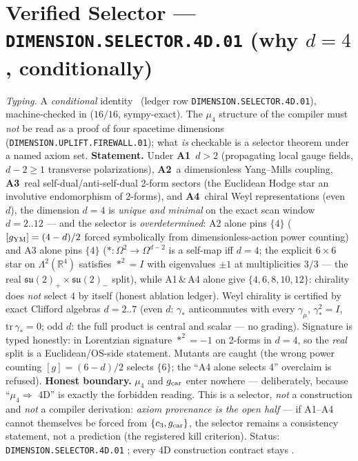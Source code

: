 \section*{Verified Selector --- \texttt{DIMENSION.SELECTOR.4D.01} (why $d=4$, conditionally)}
\noindent\emph{Typing.} A \emph{conditional} identity \mC\ (ledger row
\texttt{DIMENSION.SELECTOR.4D.01}), machine-checked in
 ($16/16$, sympy-exact).  The $\mu_4$ structure of the
compiler must \emph{not} be read as a proof of four spacetime dimensions
(\texttt{DIMENSION.UPLIFT.FIREWALL.01}); what \emph{is} checkable is a selector theorem under a
named axiom set.  \textbf{Statement.}  Under
\textbf{A1}~$d>2$ (propagating local gauge fields, $d-2\ge1$ transverse polarizations),
\textbf{A2}~a dimensionless Yang--Mills coupling,
\textbf{A3}~real self-dual/anti-self-dual 2-form sectors (the Euclidean Hodge star an involutive
endomorphism of 2-forms), and
\textbf{A4}~chiral Weyl representations (even $d$),
the dimension $d=4$ is \emph{unique and minimal} on the exact scan window $d=2..12$ --- and the
selector is \emph{overdetermined}: A2 alone pins $\{4\}$ ($[g_{\rm YM}]=(4-d)/2$ forced
symbolically from dimensionless-action power counting) and A3 alone pins $\{4\}$
($*:\Omega^2\to\Omega^{d-2}$ is a self-map iff $d=4$; the explicit $6\times6$ star on
$\Lambda^2(\mathbb R^4)$ satisfies $*^2=I$ with eigenvalues $\pm1$ at multiplicities $3/3$ ---
the real $\mathfrak{su}(2)_+\times\mathfrak{su}(2)_-$ split), while A1\,\&\,A4 alone give
$\{4,6,8,10,12\}$: chirality does \emph{not} select $4$ by itself (honest ablation ledger).
Weyl chirality is certified by exact Clifford algebras $d=2..7$ (even $d$: $\gamma_*$
anticommutes with every $\gamma_\mu$, $\gamma_*^2=I$, $\mathrm{tr}\,\gamma_*=0$; odd $d$: the
full product is central and scalar --- no grading).  Signature is typed honestly: in Lorentzian
signature $*^2=-1$ on 2-forms in $d=4$, so the \emph{real} split is a Euclidean/OS-side
statement.  Mutants are caught (the wrong power counting $[g]=(6-d)/2$ selects $\{6\}$; the
``A4 alone selects 4'' overclaim is refused).  \textbf{Honest boundary.}  $\mu_4$ and
$g_{\rm car}$ enter nowhere --- deliberately, because ``$\mu_4\Rightarrow$ 4D'' is exactly the
forbidden reading.  This is a selector, \emph{not} a construction and \emph{not} a compiler
derivation: \emph{axiom provenance is the open half} --- if A1--A4 cannot themselves be forced
from $\{c_3, g_{\rm car}\}$, the selector remains a consistency statement, not a prediction
(the registered kill criterion).  Status: \texttt{DIMENSION.SELECTOR.4D.01} \mC; every 4D
construction contract stays \mO.

